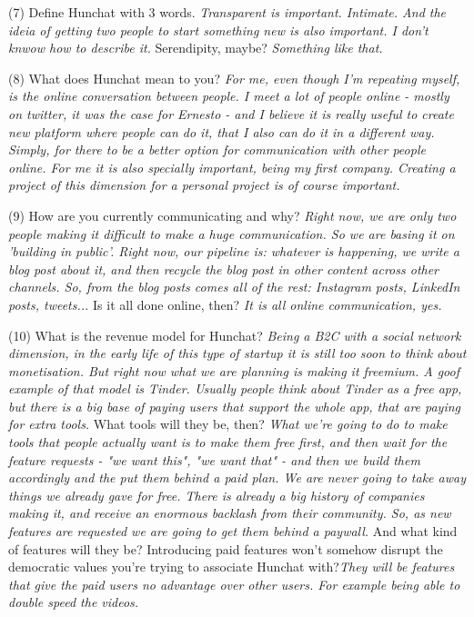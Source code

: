 \documentclass[12pt]{article}
\begin{document}
(7) Define Hunchat with 3 words. \textit{Transparent is important. Intimate. And the ideia of getting two people to start something new is also important. I don't knwow how to describe it.} Serendipity, maybe? \textit{Something like that.}

(8) What does Hunchat mean to you? \textit{For me, even though I'm repeating myself, is the online conversation between people. I meet a lot of people online - mostly on twitter, it was the case for Ernesto - and I believe it is really useful to create new platform where people can do it, that I also can do it in a different way. Simply, for there to be a better option for communication with other people online. For me it is also specially important, being my first company. Creating a project of this dimension for a personal project is of course important.}

(9) How are you currently communicating and why? \textit{Right now, we are only two people making it difficult to make a huge communication. So we are basing it on 'building in public'. Right now, our pipeline is: whatever is happening, we write a blog post about it, and then recycle the blog post in other content across other channels. So, from the blog posts comes all of the rest: Instagram posts, LinkedIn posts, tweets...} Is it all done online, then? \textit{It is all online communication, yes.}

(10) What is the revenue model for Hunchat? \textit{Being a B2C with a social network dimension, in the early life of this type of startup it is still too soon to think about monetisation. But right now what we are planning is making it freemium. A goof example of that model is Tinder. Usually people think about Tinder as a free app, but there is a big base of paying users that support the whole app, that are paying for extra tools. } What tools will they be, then? \textit{What we're going to do to make tools that people actually want is to make them free first, and then wait for the feature requests - "we want this", "we want that" -  and then we build them accordingly and the put them behind a paid plan. We are never going to take away things we already gave for free. There is already a big history of companies making it, and receive an enormous backlash from their community. So, as new features are requested we are going to get them behind a paywall.} And what kind of features will they be? Introducing paid features won't somehow disrupt  the democratic values you're trying to associate Hunchat with?\textit{They will be features that give the paid users no advantage over other users. For example being able to double speed the videos.}
\end{document}
